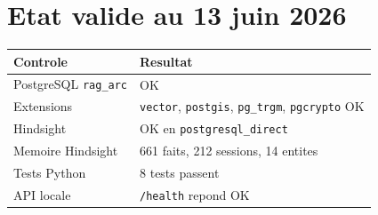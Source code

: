 \documentclass[11pt,a4paper]{article}
\begin{document}
\section{Etat valide au 13 juin 2026}

\begin{longtable}{|p{5cm}|p{9cm}|}
\hline
\textbf{Controle} & \textbf{Resultat} \\
\hline
PostgreSQL \texttt{rag\_arc} & OK \\
\hline
Extensions & \texttt{vector}, \texttt{postgis}, \texttt{pg\_trgm},
\texttt{pgcrypto} OK \\
\hline
Hindsight & OK en \texttt{postgresql\_direct} \\
\hline
Memoire Hindsight & 661 faits, 212 sessions, 14 entites \\
\hline
Tests Python & 8 tests passent \\
\hline
API locale & \texttt{/health} repond OK \\
\hline
\end{longtable}
\end{document}
